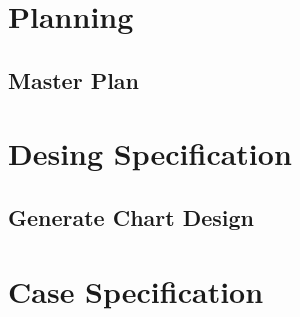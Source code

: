 \documentclass[a4paper, 12pt]{report}
\begin{document}
\tableofcontents

\part{Planning}

\chapter{Master Plan}


\part{Desing Specification}
\label{part:DesignSpecification}
\chapter{Generate Chart Design}


\part{Case Specification}
\label{part:CaseSpecification}

\end{document}
